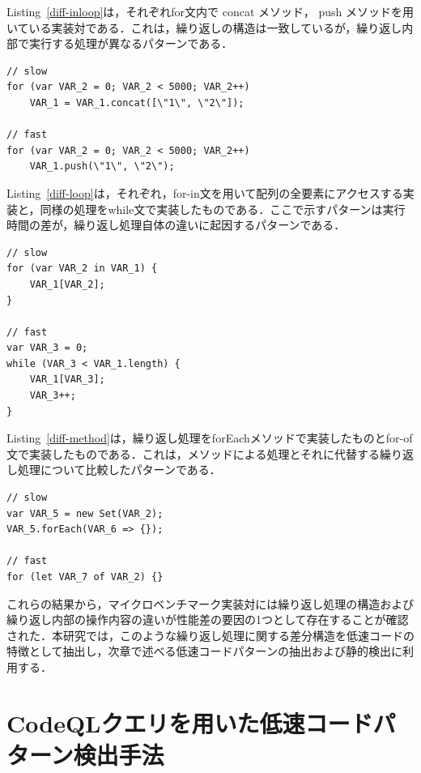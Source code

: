 \documentclass[submit,techrep,noauthor]{ipsj}
\begin{document}
Listing~\ref{diff-inloop}は，それぞれfor文内で concat メソッド， push メソッドを用いている実装対である．これは，繰り返しの構造は一致しているが，繰り返し内部で実行する処理が異なるパターンである．
\begin{lstlisting}[caption=Pairs with differences within the loop, label=diff-inloop, captionpos=t]
// slow
for (var VAR_2 = 0; VAR_2 < 5000; VAR_2++)
    VAR_1 = VAR_1.concat([\"1\", \"2\"]);

// fast
for (var VAR_2 = 0; VAR_2 < 5000; VAR_2++)
    VAR_1.push(\"1\", \"2\");
\end{lstlisting}

Listing~\ref{diff-loop}は，それぞれ，for-in文を用いて配列の全要素にアクセスする実装と，同様の処理をwhile文で実装したものである．ここで示すパターンは実行時間の差が，繰り返し処理自体の違いに起因するパターンである．
\begin{lstlisting}[caption=Pairs with loop differences, label=diff-loop, captionpos=t]
// slow
for (var VAR_2 in VAR_1) {
    VAR_1[VAR_2];
}

// fast
var VAR_3 = 0;
while (VAR_3 < VAR_1.length) {
    VAR_1[VAR_3];
    VAR_3++;
}
\end{lstlisting}

Listing~\ref{diff-method}は，繰り返し処理をforEachメソッドで実装したものとfor-of文で実装したものである．これは，メソッドによる処理とそれに代替する繰り返し処理について比較したパターンである．
\begin{lstlisting}[caption=Pairs of Method and alternative loop, label=diff-method, captionpos=t]
// slow
var VAR_5 = new Set(VAR_2);
VAR_5.forEach(VAR_6 => {});

// fast
for (let VAR_7 of VAR_2) {}
\end{lstlisting}

これらの結果から，マイクロベンチマーク実装対には繰り返し処理の構造および繰り返し内部の操作内容の違いが性能差の要因の1つとして存在することが確認された．本研究では，このような繰り返し処理に関する差分構造を低速コードの特徴として抽出し，次章で述べる低速コードパターンの抽出および静的検出に利用する．


\section{CodeQLクエリを用いた低速コードパターン検出手法}
\label{sec:approach}
\end{document}
